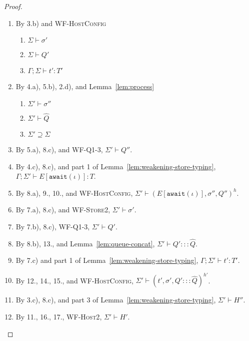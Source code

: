 \documentclass{article}
\theoremstyle{definition}
\begin{document}
\begin{proof}
\begin{itemize}
\begin{enumerate}
\item By 3.b) and \textsc{WF-HostConfig}
  \begin{enumerate}[label=(\alph*)]
  \item $\Sigma \vdash \sigma'$
  \item $\Sigma \vdash Q'$
  \item $\Gamma ; \Sigma \vdash t' : T'$
  \end{enumerate}
\item By 4.a), 5.b), 2.d), and Lemma~\ref{lem:process}
  \begin{enumerate}[label=(\alph*)]
  \item $\Sigma' \vdash \sigma''$
  \item $\Sigma' \vdash \hat{Q}$
  \item $\Sigma' \supseteq \Sigma$
  \end{enumerate}
\item By 5.a), 8.c), and \textsc{WF-Q1-3}, $\Sigma' \vdash Q''$.
\item By 4.c), 8.c), and part 1 of Lemma~\ref{lem:weakening-store-typing}, $\Gamma ; \Sigma' \vdash E[\texttt{await}(\iota)] : T$.
\item By 8.a), 9., 10., and \textsc{WF-HostConfig}, $\Sigma' \vdash (E[\texttt{await}(\iota)], \sigma'', Q'')^h$.
\item By 7.a), 8.c), and \textsc{WF-Store2}, $\Sigma' \vdash \sigma'$.
\item By 7.b), 8.c), \textsc{WF-Q1-3}, $\Sigma' \vdash Q'$.
\item By 8.b), 13., and Lemma~\ref{lem:queue-concat}, $\Sigma' \vdash Q' ::: \hat{Q}$.
\item By 7.c) and part 1 of Lemma~\ref{lem:weakening-store-typing}, $\Gamma ; \Sigma' \vdash t' : T'$.
\item By 12., 14., 15., and \textsc{WF-HostConfig}, $\Sigma' \vdash (t', \sigma', Q' ::: \hat{Q})^{h'}$.
\item By 3.c), 8.c), and part 3 of Lemma~\ref{lem:weakening-store-typing}, $\Sigma' \vdash H''$.
\item By 11., 16., 17., \textsc{WF-Host2}, $\Sigma' \vdash H'$.
\end{enumerate}

\end{itemize}

\end{proof}

\newpage
\end{document}
